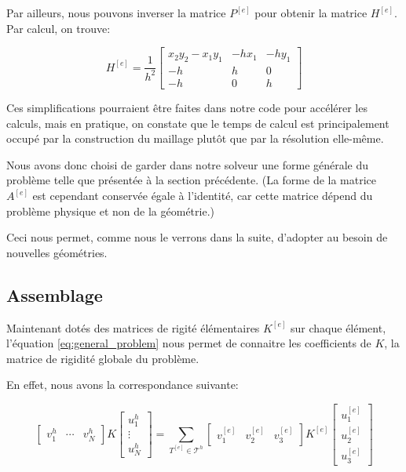 \documentclass{article}
\begin{document}
Par ailleurs, nous pouvons inverser la matrice $P^{[e]}$ pour obtenir
la matrice $H^{[e]}$. Par calcul, on trouve:

\begin{equation}
    H^{[e]} = \frac{1}{h^2}
    \begin{bmatrix}
        x_2 y_2 - x_1 y_1 & -hx_1 & -hy_1 \\
        -h & h & 0 \\
        -h & 0 & h
    \end{bmatrix}
\end{equation}

Ces simplifications pourraient être faites dans notre code pour
accélérer les calculs, mais en pratique, on constate que le temps de
calcul est principalement occupé par la construction du maillage
plutôt que par la résolution elle-même.

Nous avons donc choisi de garder dans notre solveur une forme générale
du problème telle que présentée à la section précédente.
(La forme de la matrice $A^{[e]}$ est cependant conservée égale à l'identité,
car cette matrice dépend du problème physique et non de la géométrie.)

Ceci nous permet, comme nous le verrons dans la suite,
d'adopter au besoin de nouvelles géométries.

\newpage

\subsection{Assemblage}

Maintenant dotés des matrices de rigité élémentaires $K^{[e]}$
sur chaque élément, l'équation \ref{eq:general_problem} nous permet
de connaitre les coefficients de $K$, la matrice de rigidité globale
du problème.

En effet, nous avons la correspondance suivante:

\begin{equation}
    \begin{bmatrix}
        v^h_1 & \cdots & v^h_N
    \end{bmatrix}
    K
    \begin{bmatrix}
        u^h_1 \\ \vdots \\ u^h_N
    \end{bmatrix}
    = \sum_{T^{[e]} \in \mathcal{T}^h}
    \begin{bmatrix}
        v^{[e]}_1 & v^{[e]}_2 & v^{[e]}_3
    \end{bmatrix}
    K^{[e]}
    \begin{bmatrix}
        u^{[e]}_1 \\ u^{[e]}_2 \\ u^{[e]}_3
    \end{bmatrix}
    \label{eq:assemblage}
\end{equation}
\end{document}
